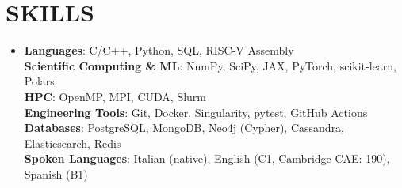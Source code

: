 \documentclass[letterpaper,11pt]{article}
\begin{document}
\section{SKILLS}
\begin{itemize}[leftmargin=0in, label={}, topsep=3pt]
    \item \small{
    \textbf{Languages}: C/C++, Python, SQL, RISC-V Assembly \\[2pt]
    \textbf{Scientific Computing \& ML}: NumPy, SciPy, JAX, PyTorch, scikit-learn, Polars \\[2pt]
    \textbf{HPC}: OpenMP, MPI, CUDA, Slurm \\[2pt]
    \textbf{Engineering Tools}: Git, Docker, Singularity, pytest, GitHub Actions \\[2pt]
    \textbf{Databases}: PostgreSQL, MongoDB, Neo4j (Cypher), Cassandra, Elasticsearch, Redis \\[2pt]
    \textbf{Spoken Languages}: Italian (native), English (C1, Cambridge CAE: 190), Spanish (B1)
    }
\end{itemize}

\end{document}
